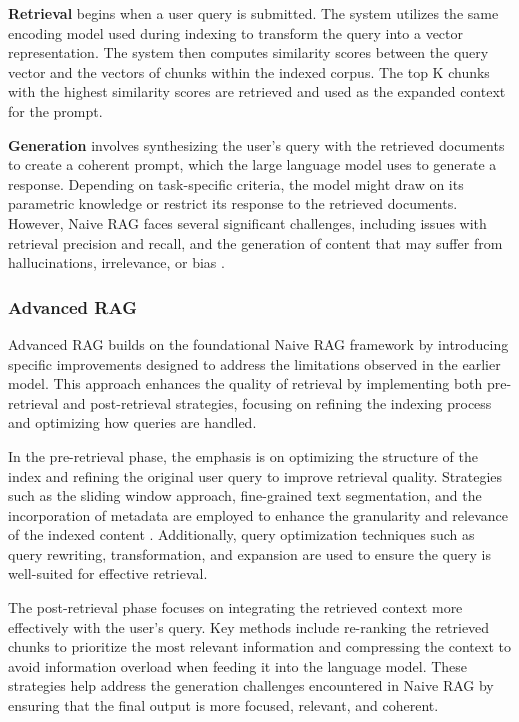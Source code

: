 \textbf{Retrieval} begins when a user query is submitted. The system utilizes the same encoding model used during indexing to transform the query into a vector representation. The system then computes similarity scores between the query vector and the vectors of chunks within the indexed corpus. The top K chunks with the highest similarity scores are retrieved and used as the expanded context for the prompt.

\textbf{Generation} involves synthesizing the user’s query with the retrieved documents to create a coherent prompt, which the large language model uses to generate a response. Depending on task-specific criteria, the model might draw on its parametric knowledge or restrict its response to the retrieved documents. However, Naive RAG faces several significant challenges, including issues with retrieval precision and recall, and the generation of content that may suffer from hallucinations, irrelevance, or bias \cite{gao2023retrieval}.

\subsubsection{Advanced RAG}

Advanced RAG builds on the foundational Naive RAG framework by introducing specific improvements designed to address the limitations observed in the earlier model. This approach enhances the quality of retrieval by implementing both pre-retrieval and post-retrieval strategies, focusing on refining the indexing process and optimizing how queries are handled.

In the pre-retrieval phase, the emphasis is on optimizing the structure of the index and refining the original user query to improve retrieval quality. Strategies such as the sliding window approach, fine-grained text segmentation, and the incorporation of metadata are employed to enhance the granularity and relevance of the indexed content \cite{ilin2023advancedrag}. Additionally, query optimization techniques such as query rewriting, transformation, and expansion are used to ensure the query is well-suited for effective retrieval.

The post-retrieval phase focuses on integrating the retrieved context more effectively with the user’s query. Key methods include re-ranking the retrieved chunks to prioritize the most relevant information and compressing the context to avoid information overload when feeding it into the language model. These strategies help address the generation challenges encountered in Naive RAG by ensuring that the final output is more focused, relevant, and coherent.

